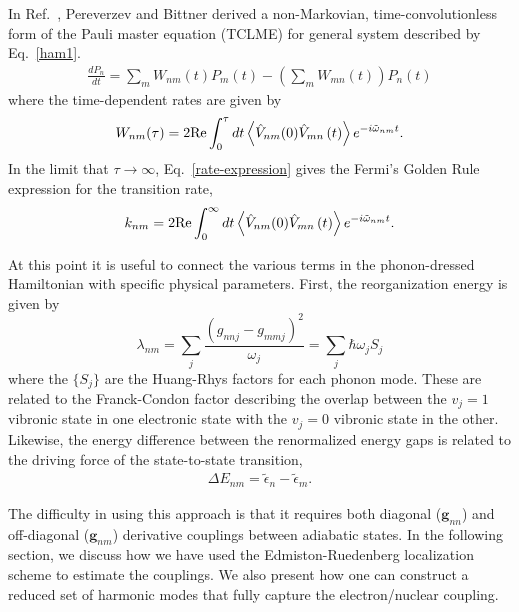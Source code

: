 In Ref.~\cite{pereverzev2006time}, Pereverzev and Bittner derived
a non-Markovian, time-convolutionless form of the Pauli master
equation (TCLME)  for general system described by Eq.~\ref{ham1}.
\begin{eqnarray}
\frac{dP_{n}}{dt} = \sum_{m} W_{nm}(t)P_{m}(t) - \left(\sum_{m} W_{mn}(t)\right)P_{n}(t)
\end{eqnarray}
where the time-dependent rates are given by
\begin{eqnarray}
W_{nm}(\tau)=2{\rm Re}\int_{0}^{\tau}dt\left\langle \hat V_{nm}(0)\hat V_{mn}\left(t\right)\right\rangle e^{-i\tilde\omega_{nm}t}.
\label{rate-expression}
\end{eqnarray}
In the limit that $\tau\to\infty$, Eq.~\ref{rate-expression} gives the Fermi's Golden Rule expression for the
transition rate,
\begin{eqnarray}
k_{nm}=2{\rm Re}\int_{0}^{\infty}dt\left\langle \hat V_{nm}(0)\hat V_{mn}\left(t\right)\right\rangle e^{-i\tilde\omega_{nm}t}.
\label{gr-expression}
\end{eqnarray}

At this point it is useful to connect the various terms in the phonon-dressed Hamiltonian
with specific physical parameters.
First, the reorganization energy is given by
\[
\lambda_{nm}=\sum_{j}\frac{\left(g_{nnj}-g_{mmj}\right)^{2}}{\omega_{j}} = \sum_{j}\hbar \omega_{j}S_{j}
\]
where  the $\{S_{j}\}$  are  the Huang-Rhys factors for each phonon mode.
These are related to the Franck-Condon factor
describing the overlap between the $v_j=1$ vibronic state in one electronic state
with the $v_j=0$ vibronic state in the other.
Likewise, the energy difference between the renormalized energy gaps is related to the
driving force of the state-to-state transition,
\begin{eqnarray}
\Delta E_{nm} = \tilde \epsilon_n-\tilde \epsilon_m.
\end{eqnarray}


The difficulty in using this approach is that
it requires both diagonal (${\mathbf g}_{nn}$) and off-diagonal  (${\mathbf g}_{nm}$) derivative couplings between
adiabatic states.    In the following section, we discuss how we have used the Edmiston-Ruedenberg localization scheme
to estimate the couplings\cite{edmiston1963localized}.   We also
present how one can construct a reduced set of harmonic modes that
fully capture the electron/nuclear coupling.
